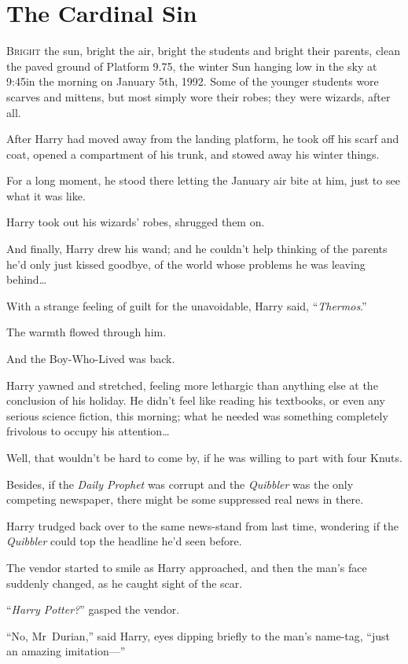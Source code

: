 \chapter{The Cardinal Sin}

\lettrine{B}{right} the sun, bright the air, bright the students and bright their parents, clean the paved ground of Platform 9.75, the winter Sun hanging low in the sky at 9:45\am in the morning on January 5th, 1992. Some of the younger students wore scarves and mittens, but most simply wore their robes; they were wizards, after all.

After Harry had moved away from the landing platform, he took off his scarf and coat, opened a compartment of his trunk, and stowed away his winter things.

For a long moment, he stood there letting the January air bite at him, just to see what it was like.

Harry took out his wizards’ robes, shrugged them on.

And finally, Harry drew his wand; and he couldn’t help thinking of the parents he’d only just kissed goodbye, of the world whose problems he was leaving behind…

With a strange feeling of guilt for the unavoidable, Harry said, “\emph{Thermos}.”

The warmth flowed through him.

And the Boy-Who-Lived was back.

Harry yawned and stretched, feeling more lethargic than anything else at the conclusion of his holiday. He didn’t feel like reading his textbooks, or even any serious science fiction, this morning; what he needed was something completely frivolous to occupy his attention…

Well, that wouldn’t be hard to come by, if he was willing to part with four Knuts.

Besides, if the \emph{Daily Prophet} was corrupt and the \emph{Quibbler} was the only competing newspaper, there might be some suppressed real news in there.

Harry trudged back over to the same news-stand from last time, wondering if the \emph{Quibbler} could top the headline he’d seen before.

The vendor started to smile as Harry approached, and then the man’s face suddenly changed, as he caught sight of the scar.

“\emph{Harry Potter?}” gasped the vendor.

“No, Mr~Durian,” said Harry, eyes dipping briefly to the man’s name-tag, “just an amazing imitation—”

